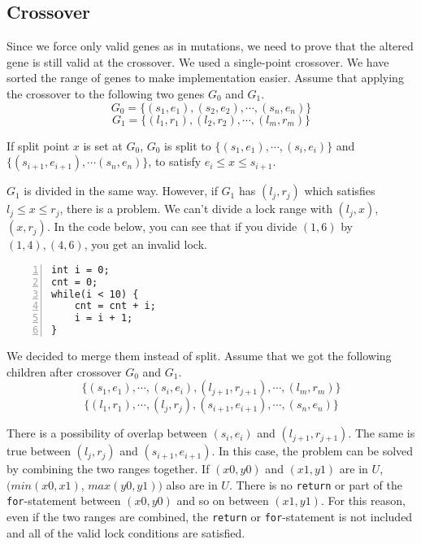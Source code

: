 \subsection{Crossover}

Since we force only valid genes as in mutations, we need to prove that the altered gene is still valid at the crossover. We used a single-point crossover. We have sorted the range of genes to make implementation easier. Assume that applying the crossover to the following two genes $G_{0}$ and $G_{1}$.
\[G_{0} = \{(s_{1}, e_{1}), (s_{2}, e_{2}), \cdots , (s_{n}, e_{n}) \}\]
\[G_{1} = \{(l_{1}, r_{1}), (l_{2}, r_{2}), \cdots , (l_{m}, r_{m}) \}\] 

If split point $x$ is set at $G_{0}$, $G_{0}$ is split to $\{(s_{1}, e_{1}), \cdots, (s_{i}, e_{i})\}$ and $\{(s_{i+1}, e_{i+1}), \cdots (s_{n}, e_{n})\}$, to satisfy $e_{i} \leq x \leq s_{i+1}$.

$G_ {1}$ is divided in the same way. However, if $G_{1}$ has $(l_{j}, r_{j})$ which satisfies $l_{j} \leq x \leq r_{j}$, there is a problem. We can't divide a lock range with $ (l_ {j}, x) $, $ (x, r_ {j}) $. In the code below, you can see that if you divide $ (1, 6) $ by $ (1,4), (4, 6) $, you get an invalid lock.

\begin{lstlisting}[frame=tb, xleftmargin=2em, framexleftmargin=1.5em, numbers=left]
int i = 0;
cnt = 0;
while(i < 10) {
    cnt = cnt + i;
    i = i + 1;
}
\end{lstlisting}

We decided to merge them instead of split. Assume that we got the following children after crossover $G_{0}$ and $G_{1}$.
\[\{ (s_{1}, e_{1}),\cdots,(s_{i}, e_{i}), (l_{j+1}, r_{j+1}), \cdots, (l_{m}, r_{m}) \}\]
\[\{ (l_{1}, r_{1}),\cdots,(l_{j},r_{j}), (s_{i+1}, e_{i+1}), \cdots, (s_{n}, e_{n}) \}\]

There is a possibility of overlap between $(s_{i}, e_{i})$ and $(l_{j+1}, r_{j+1})$. The same is true between $(l_{j}, r_{j})$ and $(s_{i+1}, e_{i+1})$. In this case, the problem can be solved by combining the two ranges together. If $(x0,y0)$ and $(x1,y1)$ are in $U$, $(min(x0,x1)$, $max(y0,y1))$ also are in $U$. There is no \verb|return| or part of the \verb|for|-statement between $(x0,y0)$ and so on between $(x1,y1)$. For this reason, even if the two ranges are combined, the \verb|return| or \verb|for|-statement is not included and all of the valid lock conditions are satisfied.